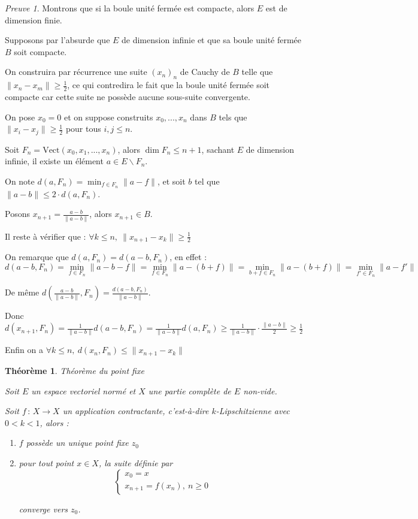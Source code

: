 \documentclass[]{article}
\newtheorem{mythm}{Théorème}
\theoremstyle{remark}
\newtheorem{myproof}{Preuve}
\theoremstyle{definition}
\newcommand{\funcshort}[3]{
#1 \, : \, #2 \longrightarrow #3
}
\begin{document}
\begin{myproof}
	Montrons que si la boule unité fermée est compacte, alors $E$ est de dimension finie.
	
	Supposons par l'absurde que $E$ de dimension infinie et que sa boule unité fermée $B$ soit compacte.
	
	On construira par récurrence une suite $(x_n)_n$ de Cauchy de $B$ telle que $\|x_n - x_m\| \geqslant \frac{1}{2}$, ce qui contredira le fait que la boule unité fermée soit compacte car cette suite ne possède aucune sous-suite convergente.
	
	On pose $x_0 = 0$ et on suppose construits $x_0, ..., x_n$ dans $B$ tels que $\|x_i - x_j\| \geqslant \frac{1}{2}$ pour tous $i, j \leqslant n$.
	
	Soit $F_n = \text{Vect}(x_0, x_1, ..., x_n)$, alors $\dim F_n \leqslant n+1$, sachant $E$ de dimension infinie, il existe un élément $a \in E \backslash F_n$.
	
	On note $d(a, F_n) = \min_{f \in F_n} \|a-f\|$, et soit $b$ tel que $\|a-b\| \leqslant 2 \cdot d(a, F_n)$.
	
	Posons $x_{n+1} = \frac{a-b}{\|a-b\|}$, alors $x_{n+1} \in B$.
	
	Il reste à vérifier que : $\forall k \leqslant n, ~ \|x_{n+1} - x_k\| \geqslant \frac{1}{2}$
	
	On remarque que $d(a, F_n)=d(a-b, F_n)$, en effet : $$d(a-b, F_n) = \min_{f \in F_n} \|a-b-f\| = \min_{f \in F_n} \|a-(b+f)\| = \min_{b+f \in F_n} \|a-(b+f)\| = \min_{f' \in F_n} \|a-f'\|$$
	
	De même $d(\frac{a-b}{\|a-b\|}, F_n) = \frac{d(a-b, F_n)}{\|a-b\|}$.
	
	Donc $d(x_{n+1}, F_n) = \frac{1}{\|a-b\|}d(a-b, F_n) = \frac{1}{\|a-b\|}d(a, F_n) \geqslant \frac{1}{\|a-b\|} \cdot \frac{\|a-b\|}{2} \geqslant \frac{1}{2}$
	
	Enfin on a $\forall k \leqslant n, ~ d(x_n, F_n) \leqslant \|x_{n+1} - x_k\|$
\end{myproof}

\begin{mythm}Théorème du point fixe

	Soit $E$ un espace vectoriel normé et $X$ une partie complète de $E$ non-vide.
	
	Soit $\funcshort{f}{X}{X}$ un application contractante, c'est-à-dire $k$-Lipschitzienne avec $0 < k < 1$, alors :
	\begin{enumerate}
		\item $f$ possède un unique point fixe $z_0$
		\item pour tout point $x \in X$, la suite définie par
		$$\left\{
			\begin{array}{l}
				x_0 = x \\
				x_{n+1} = f(x_n), ~ n \geqslant 0
			\end{array}
		\right.$$
		
		converge vers $z_0$.
	\end{enumerate}
\end{mythm}
\end{document}
